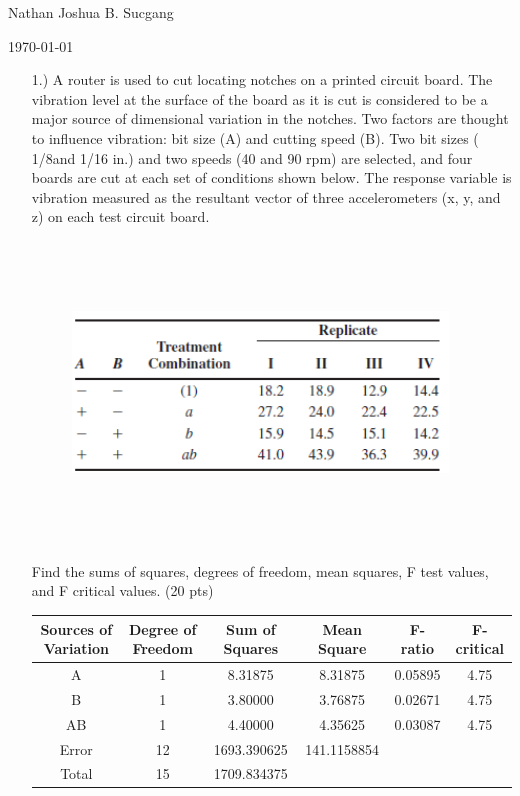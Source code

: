 \documentclass{article}
\begin{document}
Nathan Joshua B. Sucgang

\today

\begin{enumerate}
    \item[1.)] A router is used to cut locating notches on a printed circuit board. The vibration level at the surface of the board as it is cut is considered to be a major source of dimensional variation in the notches. Two factors are thought to influence vibration: bit size (A) and cutting speed (B). Two bit sizes ( 1/8and 1/16 in.) and two speeds (40 and 90 rpm) are selected, and four boards are cut at each set of conditions shown below. The response variable is vibration measured as the resultant vector of three accelerometers (x, y, and z) on each test circuit board.
    \begin{figure}[!htbp]
        \centerline{\includegraphics[width=10cm,height=8cm,keepaspectratio]{Picture 1.png}}
    \end{figure}  

    Find the sums of squares, degrees of freedom, mean squares, F test values, and F critical values. (20 pts)

    \begin{tabular}{|c|c|c|c|c|c|}
        \hline
        \textbf{Sources of Variation} & \textbf{Degree of Freedom} & \textbf{Sum of Squares} & \textbf{Mean Square} & \textbf{F-ratio} & \textbf{F-critical}\\
        \hline
        A & 1 & 8.31875 & 8.31875 & 0.05895 & 4.75 \\
        B & 1 & 3.80000 & 3.76875 & 0.02671 & 4.75 \\
        AB & 1 & 4.40000 & 4.35625 & 0.03087 & 4.75 \\
        Error & 12 & 1693.390625 & 141.1158854 & & \\
        Total & 15 & 1709.834375 & & & \\
        \hline
        \end{tabular}


\end{enumerate}
\end{document}
